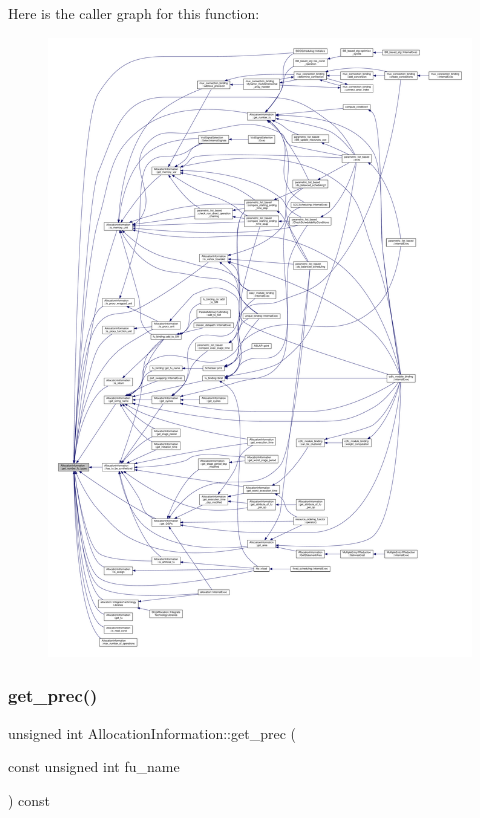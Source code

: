 Here is the caller graph for this function\+:
\nopagebreak
\begin{figure}[H]
\begin{center}
\leavevmode
\includegraphics[width=350pt]{d7/d79/classAllocationInformation_a65af57d814c6e799706348b32abdb05f_icgraph}
\end{center}
\end{figure}
\mbox{\label{classAllocationInformation_ac2e117b073287246d06915ef5d089ae5}} 
\subsubsection{\texorpdfstring{get\+\_\+prec()}{get\_prec()}}
{\footnotesize\ttfamily unsigned int Allocation\+Information\+::get\+\_\+prec (\begin{DoxyParamCaption}\item[{const unsigned int}]{fu\+\_\+name }\end{DoxyParamCaption}) const}



